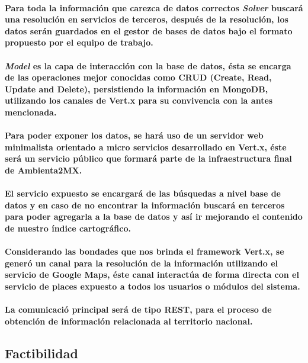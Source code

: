     \paragraph{Para toda la información que carezca de datos correctos \textbf{\emph{Solver}} buscará una resolución en servicios de terceros, después de la resolución, los datos serán guardados en el gestor de bases de datos bajo el formato propuesto por el equipo de trabajo.}
    \paragraph{\textbf{\emph{Model}} es la capa de interacción con la base de datos, ésta se encarga de las operaciones mejor conocidas como CRUD (Create, Read, Update and Delete),  persistiendo la información en MongoDB, utilizando los canales de Vert.x para su convivencia con la antes mencionada.}
    \paragraph{Para poder exponer los datos, se hará uso de un servidor web minimalista orientado a micro servicios desarrollado en Vert.x, éste será un servicio público que formará parte de la infraestructura final de Ambienta2MX.}
    \paragraph{El servicio expuesto se encargará de las búsquedas a nivel base de datos y en caso de no encontrar la información buscará en terceros para poder agregarla a la base de datos y así ir mejorando el contenido de nuestro índice cartográfico.}
    \paragraph{Considerando las bondades que nos brinda el framework Vert.x, se generó un canal para la resolución de la información utilizando el servicio de Google Maps, éste canal interactúa de forma directa con el servicio de places expuesto a todos los usuarios o módulos del sistema.}
    \paragraph{La comunicació principal será de tipo REST, para el proceso de 
    obtención de información relacionada al territorio nacional.}
  \subsection{Factibilidad}      
